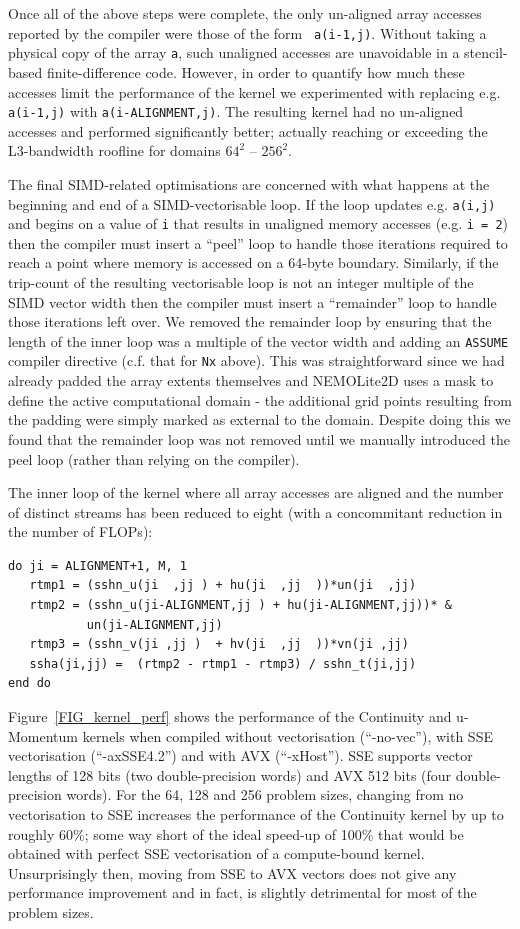 \documentclass[12pt]{article}
\begin{document}
Once all of the above steps were complete, the only un-aligned array
accesses reported by the compiler were those of the form {\tt
  a(i-1,j)}. Without taking a physical copy of the array {\tt a}, such
unaligned accesses are unavoidable in a stencil-based
finite-difference code. However, in order to quantify how much these
accesses limit the performance of the kernel we experimented with
replacing e.g. {\tt a(i-1,j)} with {\tt a(i-ALIGNMENT,j)}. The
resulting kernel had no un-aligned accesses and performed
significantly better; actually reaching or exceeding the L3-bandwidth
roofline for domains $64^2$ -- $256^2$.

The final SIMD-related optimisations are concerned with what happens
at the beginning and end of a SIMD-vectorisable loop. If the loop
updates e.g. {\tt a(i,j)} and begins on a value of {\tt i} that
  results in unaligned memory accesses (e.g. {\tt i = 2}) then the
  compiler must insert a ``peel'' loop to handle those iterations
  required to reach a point where memory is accessed on a 64-byte
  boundary.  Similarly, if the trip-count of the resulting
  vectorisable loop is not an integer multiple of the SIMD vector
  width then the compiler must insert a ``remainder'' loop to handle
  those iterations left over.  We removed the remainder loop by
  ensuring that the length of the inner loop was a multiple of the
  vector width and adding an {\tt ASSUME} compiler directive
  (c.f. that for {\tt Nx} above). This was straightforward since we
  had already padded the array extents themselves and NEMOLite2D uses
  a mask to define the active computational domain - the additional
  grid points resulting from the padding were simply marked as
  external to the domain.  Despite doing this we found that the
  remainder loop was not removed until we manually introduced the peel
  loop (rather than relying on the compiler).

The inner loop of the kernel where all array accesses are aligned and
the number of distinct streams has been reduced to eight (with a
concommitant reduction in the number of FLOPs):
\begin{verbatim}
do ji = ALIGNMENT+1, M, 1
   rtmp1 = (sshn_u(ji  ,jj ) + hu(ji  ,jj  ))*un(ji  ,jj)
   rtmp2 = (sshn_u(ji-ALIGNMENT,jj ) + hu(ji-ALIGNMENT,jj))* &
           un(ji-ALIGNMENT,jj)
   rtmp3 = (sshn_v(ji ,jj )  + hv(ji  ,jj  ))*vn(ji ,jj)
   ssha(ji,jj) =  (rtmp2 - rtmp1 - rtmp3) / sshn_t(ji,jj)
end do
\end{verbatim}

Figure~\ref{FIG_kernel_perf} shows the performance of the Continuity
and u-Momentum kernels when compiled without vectorisation
(``-no-vec''), with SSE vectorisation (``-axSSE4.2'') and with AVX
(``-xHost''). SSE supports vector lengths of 128 bits (two
double-precision words) and AVX 512 bits (four double-precision
words). For the 64, 128 and 256 problem sizes, changing from no
vectorisation to SSE increases the performance of the Continuity
kernel by up to roughly 60\%; some way short of the ideal speed-up of
100\% that would be obtained with perfect SSE vectorisation of a
compute-bound kernel. Unsurprisingly then, moving from SSE to AVX
vectors does not give any performance improvement and in fact, is
slightly detrimental for most of the problem sizes.
\end{document}
